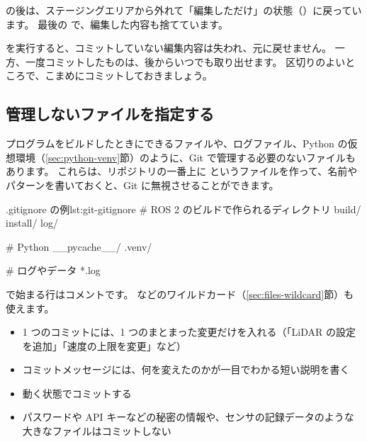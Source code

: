 
 の後は、ステージングエリアから外れて「編集しただけ」の状態（）に戻っています。
最後の  で、編集した内容も捨てています。

\begin{caution}
   を実行すると、コミットしていない編集内容は失われ、元に戻せません。
  一方、一度コミットしたものは、後からいつでも取り出せます。
  区切りのよいところで、こまめにコミットしておきましょう。
\end{caution}

\subsection{管理しないファイルを指定する}

プログラムをビルドしたときにできるファイルや、ログファイル、Python の仮想環境（\ref{sec:python-venv}節）のように、Git で管理する必要のないファイルもあります。
これらは、リポジトリの一番上に  というファイルを作って、名前やパターンを書いておくと、Git に無視させることができます。

\begin{codelisting}{.gitignore の例}{lst:git-gitignore}
# ROS 2 のビルドで作られるディレクトリ
build/
install/
log/

# Python
__pycache__/
.venv/

# ログやデータ
*.log
\end{codelisting}

\cmd{\#} で始まる行はコメントです。
\cmd{*} などのワイルドカード（\ref{sec:files-wildcard}節）も使えます。

\begin{point}[よいコミットのコツ]
  \begin{itemize}
    \item 1 つのコミットには、1 つのまとまった変更だけを入れる（「LiDAR の設定を追加」「速度の上限を変更」など）
    \item コミットメッセージには、何を変えたのかが一目でわかる短い説明を書く
    \item 動く状態でコミットする
    \item パスワードや API キーなどの秘密の情報や、センサの記録データのような大きなファイルはコミットしない
  \end{itemize}
\end{point}

